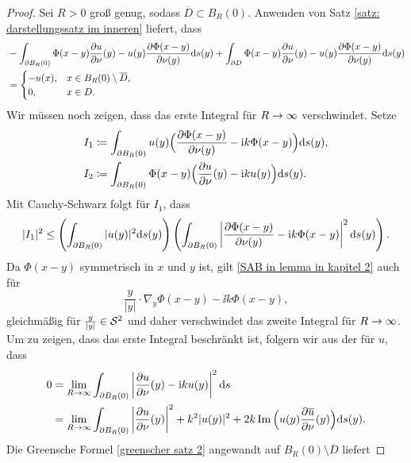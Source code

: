 \begin{proof}
	Sei \(R>0\) groß genug, sodass \(\overline{D}\subset B_R(0)\). Anwenden von Satz \ref{satz: darstellungssatz im inneren} liefert, dass
	\begin{align*}
		&-\int_{\partial B_R(0)}\Phi(x-y)\frac{\partial u}{\partial\nu}(y)-u(y)\frac{\partial\Phi(x-y)}{\partial\nu(y)}\mathrm{d}s(y)
		+\int_{\partial D}\Phi(x-y)\frac{\partial u}{\partial\nu}(y)-u(y)\frac{\partial\Phi(x-y)}{\partial\nu(y)}\mathrm{d}s(y)\\
		&=\begin{cases}
			-u(x),&x\in B_R(0)\setminus\overline{D},\\
			0,&x\in D.
		\end{cases}
	\end{align*}
	Wir müssen noch zeigen, dass das erste Integral für \(R\rightarrow\infty\) verschwindet. Setze
	\begin{align*}
		I_1&\coloneqq\int_{\partial B_R(0)}u(y)\Big(\frac{\partial\Phi(x-y)}{\partial\nu(y)}-\mathrm{i} k\Phi(x-y)\Big)\mathrm{d}s(y),\\
		I_2&\coloneqq\int_{\partial B_R(0)}\Phi(x-y)\Big(\frac{\partial u}{\partial\nu}(y)-\mathrm{i} ku(y)\Big)\mathrm{d}s(y).
	\end{align*}
	Mit Cauchy-Schwarz folgt für \(I_1\), dass
	\begin{equation*}
		|I_1|^2\leq\left(\int_{\partial B_R(0)}|u(y)|^2\mathrm{d}s(y)\right)\left(\int_{\partial B_R(0)}\left|\frac{\partial\Phi(x-y)}{\partial\nu(y)}-\mathrm{i} k\Phi(x-y)\right|^2\mathrm{d}s(y)\right).
	\end{equation*}
	Da \(\Phi(x-y)\) symmetrisch in \(x\) und \(y\) ist, gilt \eqref{SAB in lemma in kapitel 2} auch für
	\begin{equation*}
		\frac{y}{|y|}\cdot\nabla_y\Phi(x-y)-\ii k\Phi(x-y),
	\end{equation*}
	 gleichmäßig für \(\frac{y}{|y|}\in\mathcal{S}^2\) und daher verschwindet das zweite Integral für \(R\rightarrow\infty\). Um zu zeigen, dass das erste Integral beschränkt ist, folgern wir aus der \SAB für \(u\), dass
	 \begin{equation}
	 	\label{darstellungssatz im äußeren beweis 1}
	 	\begin{aligned}
	 		0&=\lim_{R\rightarrow\infty}\int_{\partial B_R(0)}\left|\frac{\partial u}{\partial\nu}(y)-\mathrm{i} ku(y)\right|^2\mathrm{d}s\\
	 		&=\lim_{R\rightarrow\infty}\int_{\partial B_R(0)}\left|\frac{\partial u}{\partial\nu}(y)\right|^2+k^2|u(y)|^2+2k\operatorname{Im}\Big(u(y)\frac{\partial \overline{u}}{\partial\nu}(y)\Big)\mathrm{d}s(y).
	 	\end{aligned}
	 \end{equation}
 	Die Greensche Formel \eqref{greenscher satz 2} angewandt auf \(B_R(0)\setminus\overline{D}\) liefert

\end{proof}
